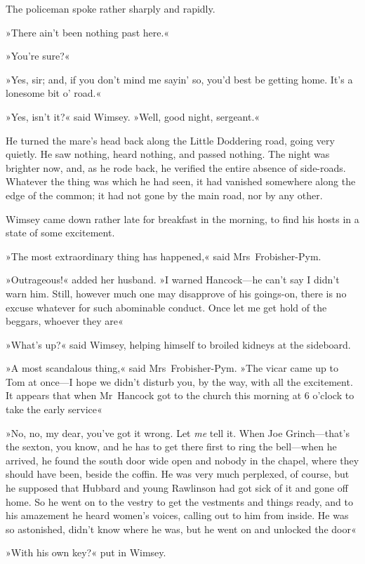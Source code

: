 The policeman spoke rather sharply and rapidly.

»There ain't been nothing past here.«

»You're sure?«

»Yes, sir; and, if you don't mind me sayin' so, you'd best be getting home. It's a lonesome bit o' road.«

»Yes, isn't it?« said Wimsey. »Well, good night, sergeant.«

He turned the mare's head back along the Little Doddering road, going very quietly. He saw nothing, heard nothing, and passed nothing. The night was brighter now, and, as he rode back, he verified the entire absence of side-roads. Whatever the thing was which he had seen, it had vanished somewhere along the edge of the common; it had not gone by the main road, nor by any other.

\divider
Wimsey came down rather late for breakfast in the morning, to find his hosts in a state of some excitement.

»The most extraordinary thing has happened,« said Mrs~Frobisher-Pym.

»Outrageous!« added her husband. »I warned Hancock—he can't say I didn't warn him. Still, however much one may disapprove of his goings-on, there is no excuse whatever for such abominable conduct. Once let me get hold of the beggars, whoever they are\longdash«

»What's up?« said Wimsey, helping himself to broiled kidneys at the sideboard.

»A most scandalous thing,« said Mrs~Frobisher-Pym. »The vicar came up to Tom at once—I hope we didn't disturb you, by the way, with all the excitement. It appears that when Mr~Hancock got to the church this morning at 6 o'clock to take the early service\longdash«

»No, no, my dear, you've got it wrong. Let \textit{me} tell it. When Joe Grinch—that's the sexton, you know, and he has to get there first to ring the bell—when he arrived, he found the south door wide open and nobody in the chapel, where they should have been, beside the coffin. He was very much perplexed, of course, but he supposed that Hubbard and young Rawlinson had got sick of it and gone off home. So he went on to the vestry to get the vestments and things ready, and to his amazement he heard women's voices, calling out to him from inside. He was so astonished, didn't know where he was, but he went on and unlocked the door\longdash«

»With his own key?« put in Wimsey.

